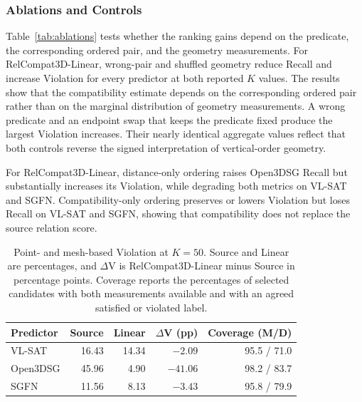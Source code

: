 \subsubsection{Ablations and Controls}
Table~\ref{tab:ablations} tests whether the ranking gains depend on the predicate, the corresponding ordered pair, and the geometry measurements. For RelCompat3D-Linear, wrong-pair and shuffled geometry reduce Recall and increase Violation for every predictor at both reported $K$ values. The results show that the compatibility estimate depends on the corresponding ordered pair rather than on the marginal distribution of geometry measurements. A wrong predicate and an endpoint swap that keeps the predicate fixed produce the largest Violation increases. Their nearly identical aggregate values reflect that both controls reverse the signed interpretation of vertical-order geometry. 

For RelCompat3D-Linear, distance-only ordering raises Open3DSG Recall but substantially increases its Violation, while degrading both metrics on VL-SAT and SGFN. Compatibility-only ordering preserves or lowers Violation but loses Recall on VL-SAT and SGFN, showing that compatibility does not replace the source relation score.

\begin{table}[t]
    \centering
    {\small
    \setlength{\tabcolsep}{1.5pt}
    \begin{tabular}{@{}lrrrr@{}}
    \toprule
    Predictor & Source & Linear & $\Delta$V (pp) & Coverage (M/D) \\
    \midrule
    VL-SAT   & 16.43 & 14.34 & $-2.09$ & 95.5 / 71.0 \\
    Open3DSG & 45.96 & 4.90  & $-41.06$ & 98.2 / 83.7 \\
    SGFN     & 11.56 & 8.13  & $-3.43$ & 95.8 / 79.9 \\
    \bottomrule
    \end{tabular}
    }
    \caption{Point- and mesh-based Violation at $K=50$. Source and Linear are percentages, and $\Delta$V is RelCompat3D-Linear minus Source in percentage points. Coverage reports the percentages of selected candidates with both measurements available and with an agreed satisfied or violated label.}
    \label{tab:surface-audit}
\end{table}

